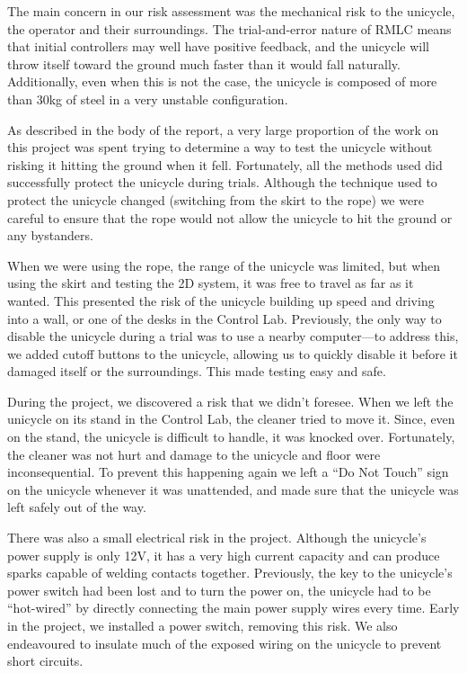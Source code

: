 \documentclass{IIBproject}
\begin{document}
The main concern in our risk assessment was the mechanical risk to the
unicycle, the operator and their surroundings. The trial-and-error nature of
RMLC means that initial controllers may well have positive feedback, and the
unicycle will throw itself toward the ground much faster than it would fall
naturally. Additionally, even when this is not the case, the unicycle is
composed of more than 30kg of steel in a very unstable configuration.

As described in the body of the report, a very large proportion of the work on
this project was spent trying to determine a way to test the unicycle without
risking it hitting the ground when it fell. Fortunately, all the methods used
did successfully protect the unicycle during trials. Although the technique
used to protect the unicycle changed (switching from the skirt to the rope) we
were careful to ensure that the rope would not allow the unicycle to hit the
ground or any bystanders.

When we were using the rope, the range of the unicycle was limited, but when
using the skirt and testing the 2D system, it was free to travel as far as it
wanted. This presented the risk of the unicycle building up speed and driving
into a wall, or one of the desks in the Control Lab. Previously, the only way
to disable the unicycle during a trial was to use a nearby computer---to
address this, we added cutoff buttons to the unicycle, allowing us to quickly
disable it before it damaged itself or the surroundings. This made testing
easy and safe.

During the project, we discovered a risk that we didn't foresee. When we left
the unicycle on its stand in the Control Lab, the cleaner tried to move it.
Since, even on the stand, the unicycle is difficult to handle, it was knocked
over. Fortunately, the cleaner was not hurt and damage to the unicycle and
floor were inconsequential. To prevent this happening again we left a ``Do
Not Touch'' sign on the unicycle whenever it was unattended, and made sure
that the unicycle was left safely out of the way.

There was also a small electrical risk in the project. Although the unicycle's
power supply is only 12V, it has a very high current capacity and can
produce sparks capable of welding contacts together. Previously, the key to
the unicycle's power switch had been lost and to turn the power on, the
unicycle had to be ``hot-wired'' by directly connecting the main power supply
wires every time. Early in the project, we installed a power switch, removing
this risk. We also endeavoured to insulate much of the exposed wiring on the
unicycle to prevent short circuits.
\end{document}
